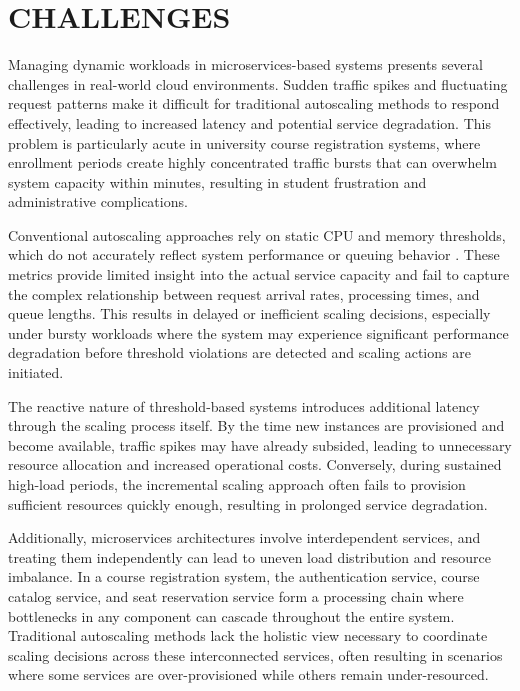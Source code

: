 \section{CHALLENGES}

Managing dynamic workloads in microservices-based systems presents several challenges in real-world cloud environments. Sudden traffic spikes and fluctuating request patterns make it difficult for traditional autoscaling methods to respond effectively, leading to increased latency and potential service degradation. This problem is particularly acute in university course registration systems, where enrollment periods create highly concentrated traffic bursts that can overwhelm system capacity within minutes, resulting in student frustration and administrative complications.

Conventional autoscaling approaches rely on static CPU and memory thresholds, which do not accurately reflect system performance or queuing behavior \cite{fourati2021}. These metrics provide limited insight into the actual service capacity and fail to capture the complex relationship between request arrival rates, processing times, and queue lengths. This results in delayed or inefficient scaling decisions, especially under bursty workloads where the system may experience significant performance degradation before threshold violations are detected and scaling actions are initiated.

The reactive nature of threshold-based systems introduces additional latency through the scaling process itself. By the time new instances are provisioned and become available, traffic spikes may have already subsided, leading to unnecessary resource allocation and increased operational costs. Conversely, during sustained high-load periods, the incremental scaling approach often fails to provision sufficient resources quickly enough, resulting in prolonged service degradation.

Additionally, microservices architectures involve interdependent services, and treating them independently can lead to uneven load distribution and resource imbalance. In a course registration system, the authentication service, course catalog service, and seat reservation service form a processing chain where bottlenecks in any component can cascade throughout the entire system. Traditional autoscaling methods lack the holistic view necessary to coordinate scaling decisions across these interconnected services, often resulting in scenarios where some services are over-provisioned while others remain under-resourced.

